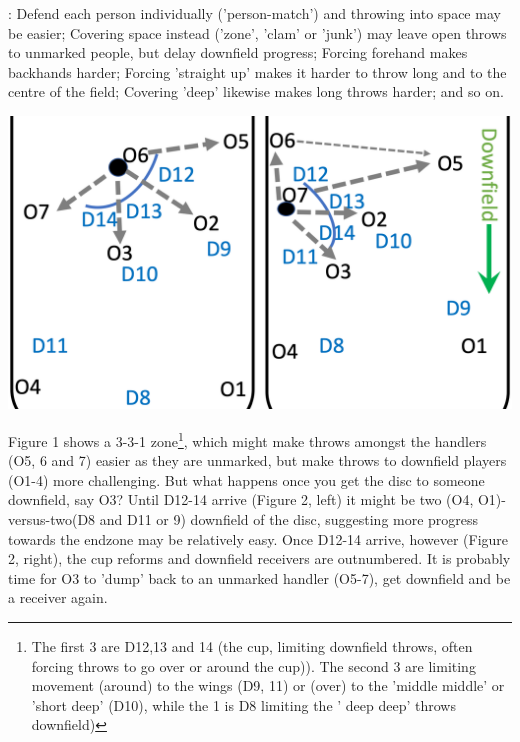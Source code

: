 \documentclass{tufte-handout}
\begin{document}
:
Defend each person individually ('person-match')
and throwing into space may be easier;
Covering space instead ('zone', 'clam' or 'junk') may leave open throws to unmarked people, 
but delay downfield progress;
Forcing forehand makes backhands harder; 
Forcing 'straight up' makes it harder to throw long 
and to the centre of the field; 
Covering 'deep' likewise makes long throws harder; and so on. 

\begin{marginfigure}%
  \includegraphics[width=\linewidth]{dump_zone}
 \caption{3-3-1 zone}
 \label{fig:dump_zone}
 \end{marginfigure}

Figure 1 shows a 3-3-1 zone\footnote{The first 3 are D12,13 and 14 (the cup, limiting downfield throws, often forcing throws to go over or around the cup)). 
The second 3 are limiting movement (around) to the wings (D9, 11) or (over) to the 'middle middle' or 'short deep' (D10), 
while the 1 is D8 limiting the ' deep deep' throws downfield)}, 
which might make throws amongst the handlers 
(O5, 6 and 7) easier as they are unmarked,
but make throws to downfield players
(O1-4) more challenging.  
But what happens once you get the disc 
to someone downfield, say O3? 
Until D12-14 arrive (Figure 2, left) it might be 
two (O4, O1)-versus-two(D8 and D11 or 9) 
downfield of the disc, 
suggesting more progress 
towards the endzone may be relatively easy. 
 Once D12-14 arrive, however (Figure 2, right), 
the cup reforms and downfield receivers are outnumbered. 
It is probably time for O3 to 'dump' 
back to an unmarked handler (O5-7), 
get downfield and 
be a receiver again.  
\end{document}
